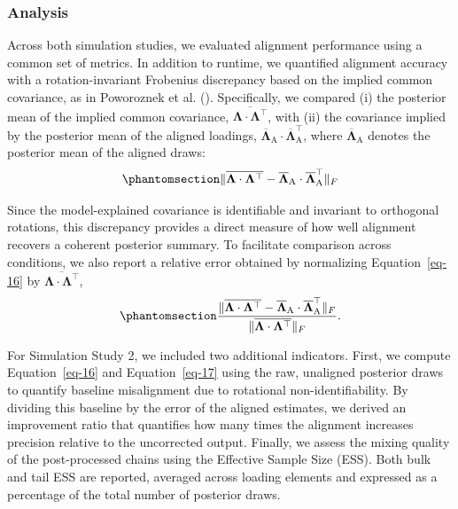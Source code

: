 \documentclass[
  man,
  longtable,
  nolmodern,
  notxfonts,
  notimes,
  colorlinks=true,linkcolor=blue,citecolor=blue,urlcolor=blue]{apa7}
\theoremstyle{plain}
\theoremstyle{plain}
\theoremstyle{remark}
\begin{document}
\subsubsection{Analysis}\label{analysis}

Across both simulation studies, we evaluated alignment performance using
a common set of metrics. In addition to runtime, we quantified alignment
accuracy with a rotation-invariant Frobenius discrepancy based on the
implied common covariance, as in Poworoznek et al.
(). Specifically, we compared (i) the
posterior mean of the implied common covariance,
\(\overline{\mathbf\Lambda\cdot\mathbf\Lambda^\top}\), with (ii) the
covariance implied by the posterior mean of the aligned loadings,
\(\overline{\mathbf\Lambda}_{\text{A}}\cdot\overline{\mathbf\Lambda}_{\text{A}}^\top\),
where \(\overline{\mathbf\Lambda}_{\text{A}}\) denotes the posterior
mean of the aligned draws: \begin{equation}\phantomsection\label{eq-16}{
\|\overline{\mathbf\Lambda\cdot\mathbf\Lambda^\top} - \overline{\mathbf\Lambda}_{\text{A}}\cdot\overline{\mathbf\Lambda}_{\text{A}}^\top\|_{F}
}\end{equation}

Since the model-explained covariance is identifiable and invariant to
orthogonal rotations, this discrepancy provides a direct measure of how
well alignment recovers a coherent posterior summary. To facilitate
comparison across conditions, we also report a relative error obtained
by normalizing Equation~\ref{eq-16} by
\(\overline{\mathbf\Lambda\cdot\mathbf\Lambda^\top}\),
\begin{equation}\phantomsection\label{eq-17}{
\frac{\|\overline{\mathbf\Lambda\cdot\mathbf\Lambda^\top} - \overline{\mathbf\Lambda}_{\text{A}}\cdot\overline{\mathbf\Lambda}_{\text{A}}^\top\|_{F}}{\|\overline{\mathbf\Lambda\cdot\mathbf\Lambda^\top}\|_F}. 
}\end{equation}

For Simulation Study 2, we included two additional indicators. First, we
compute Equation~\ref{eq-16} and Equation~\ref{eq-17} using the raw,
unaligned posterior draws to quantify baseline misalignment due to
rotational non-identifiability. By dividing this baseline by the error
of the aligned estimates, we derived an improvement ratio that
quantifies how many times the alignment increases precision relative to
the uncorrected output. Finally, we assess the mixing quality of the
post-processed chains using the Effective Sample Size (ESS). Both bulk
and tail ESS are reported, averaged across loading elements and
expressed as a percentage of the total number of posterior draws.
\end{document}
